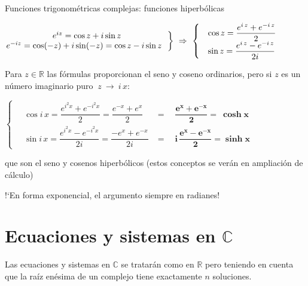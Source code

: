 \vspace{5mm}
\begin{myalertblock}{Funciones trigonométricas complejas: funciones hiperbólicas}

$\left. { \mqty{e^{iz}=\cos z+i\sin z\\ e^{-iz}=\cos(-z)+i\sin(-z)=\cos z-i\sin z\ \ } } \right\} \ \Rightarrow \ \begin{cases}
\quad \cos z=\dfrac{e^{i\, z}+e^{-i\, z}}{2} 	\\ \quad \sin z=\dfrac{e^{i\, z}-e^{-i\, z}}{2i}
 \end{cases}$	
 
\vspace{2mm} Para $z\in \mathbb R$ las fórmulas proporcionan el seno y coseno ordinarios, pero si  $z$ es un número imaginario puro $\ z \ \to \ i\, x$:

\vspace{2mm} $\begin{cases}
\quad \cos i\, x=\dfrac{e^{i^2x}+e^{-i^2x}}{2}= \dfrac{e^{-x}+e^x}{2}& = \quad \boldsymbol{
\dfrac{ e^x+e^{-x} }{2} 
} \boldsymbol{=\ \cosh x}	\\ 
\quad \sin i\, x=\dfrac{e^{i^2x}-e^{-i^2x}}{2i}=\dfrac{-e^{x}+e^{-x}}{2i} & =\quad \boldsymbol{i \, \dfrac{e^x-e^{-x}}{2} } \boldsymbol{=\sinh x}
 \end{cases}$
 
 \vspace{2mm} que son el seno y cosenos hiperbólicos \textcolor{gris}{(estos conceptos se verán en ampliación de cálculo)}
 
 \vspace{2mm} \textsf{!`En forma exponencial, el argumento siempre en radianes!}
\end{myalertblock}



\vspace{1cm}
\section{Ecuaciones y sistemas en $\mathbb C$}
\vspace{0.5cm}

Las ecuaciones y sistemas en $\mathbb C$ se tratarán como en $\mathbb R$ pero teniendo en cuenta que la raíz enésima de un complejo tiene exactamente $n$ soluciones.


